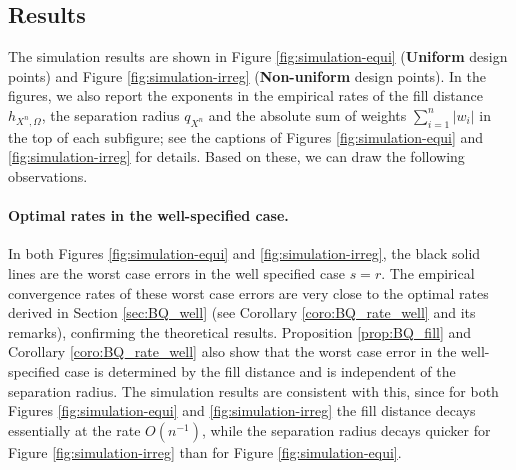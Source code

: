 \documentclass[11pt]{article}
\theoremstyle{remark}
\theoremstyle{example}
\theoremstyle{remark}
\newcommand{\R}{\mathbb{R}}
\begin{document}
\begin{comment}
Define integrands by 
\begin{eqnarray}
f_s(x) := \sum_{j=1}^\infty j^{-(p+ sq)} \cos ( j^q 2\pi x), \quad s \in \mathbb{N}.
\end{eqnarray}
Then $f_s \in W_2^s(\R)$ but $f_s \not\in W_2^s(\R)$. 
The integrals over $[0,1]$ are given by
$$
\int_0^1 f_s(0) = 0, \quad s \in \mathbb{N}.
$$
\paragraph{Other Integrands}
For $x \in [0,1]$, define
\begin{eqnarray*}
f_1(x) := x^{3/2},\ \ f_2(x) := x^{5/2},\ \  f_3(x) := x^{7/2},\ \ f_4(x) := x^{9/2}.
\end{eqnarray*}
Then it is easy to see that $f_s \in W_2^s([0,1])$ but $f \notin W_2^{s+1}([0,1])$ for $s = 1,\dots,4$.
\end{comment}








\subsection{Results}
The simulation results are shown in Figure \ref{fig:simulation-equi} (\textbf{Uniform} design points) and Figure \ref{fig:simulation-irreg} (\textbf{Non-uniform} design points).
In the figures, we also report the exponents in the empirical rates of the fill distance $h_{X^n,\Omega}$, the separation radius $q_{X^n}$ and the absolute sum of weights $\sum_{i=1}^n |w_i|$ in the top of each subfigure; see the captions of Figures \ref{fig:simulation-equi} and \ref{fig:simulation-irreg} for details. Based on these, we can draw the following observations.

\paragraph{Optimal rates in the well-specified case.}
In both Figures \ref{fig:simulation-equi} and \ref{fig:simulation-irreg}, the black solid lines are the worst case errors in the well specified case $s = r$.
The empirical convergence rates of these worst case errors are very close to the optimal rates derived in Section \ref{sec:BQ_well} (see Corollary \ref{coro:BQ_rate_well} and its remarks), confirming the theoretical results.
Proposition \ref{prop:BQ_fill} and Corollary \ref{coro:BQ_rate_well} also show that the worst case error in the well-specified case is determined by the fill distance and is independent of the separation radius.
The simulation results are consistent with this, since for both Figures \ref{fig:simulation-equi} and \ref{fig:simulation-irreg} the fill distance decays essentially at the rate $O(n^{-1})$, while the separation radius decays quicker for Figure \ref{fig:simulation-irreg} than for Figure \ref{fig:simulation-equi}.
\end{document}
